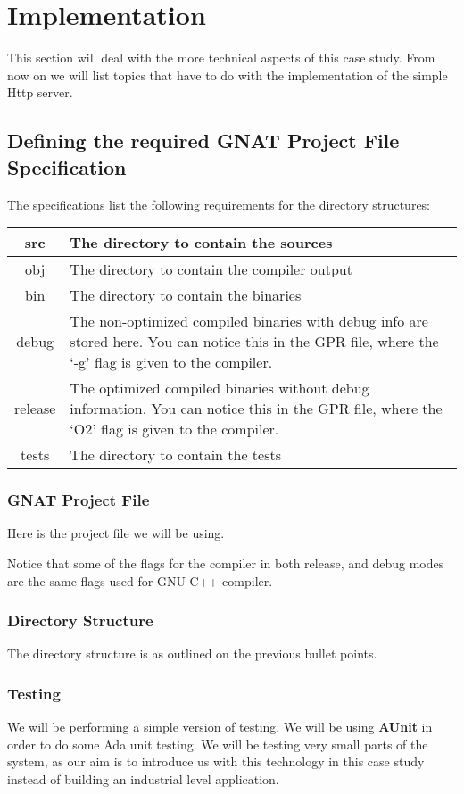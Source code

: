 \section{Implementation}
This section will deal with the more technical aspects of this case study. From now on we will list topics that have to do with the implementation of the simple Http server.

\subsection{Defining the required GNAT Project File Specification}
The specifications list the following requirements for the directory structures: 
\begin{center}
\begin{tabular}{|c|l|}
\hline
src & The directory to contain the sources \\ \hline
obj & The directory to contain the compiler output \\ \hline
bin & The directory to contain the binaries \\ \hline
debug & \parbox{10cm}{The non-optimized compiled binaries with debug info are stored here. You can notice this in the GPR file, where the `-g' flag is given to the compiler.} \\ \hline
release &  \parbox{10cm}{The optimized compiled binaries without debug information. You  can notice this in the GPR file, where the `O2' flag is given to the compiler.} \\ \hline
tests & The directory to contain the tests \\ \hline
\end{tabular}
\end{center}
\subsubsection{GNAT Project File}
Here is the project file we will be using.

Notice that some of the flags for the compiler in both release, and debug modes are the same flags used for GNU C++ compiler.

\subsubsection{Directory Structure}
The directory structure is as outlined on the previous bullet points.	

\subsubsection{Testing}
We will be performing a simple version of testing. We will be using \textbf{AUnit} in order to do some Ada unit testing. We will be testing very small parts of the system, as our aim is to introduce us with this technology in this case study instead of building an industrial level application.